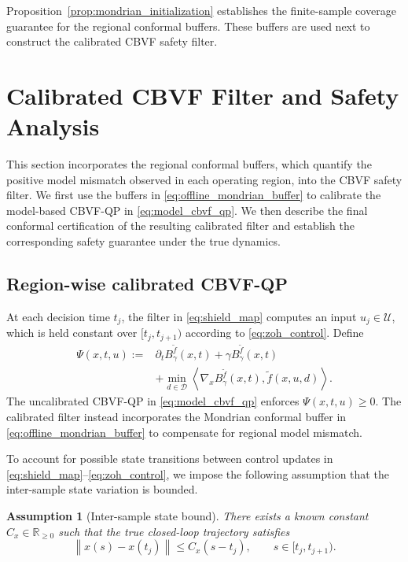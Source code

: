 \documentclass[letterpaper,10pt,conference]{ieeeconf}
\newtheorem{assumption}{Assumption}
\newcommand{\Bm}{B_{\gamma}^{\tilde f}}
\newcommand{\fapp}{\widetilde{f}}
\newcommand{\xv}{x}
\newcommand{\uv}{u}
\newcommand{\dv}{d}
\newcommand{\Uv}{\mathcal{U}}
\newcommand{\Dv}{\mathcal{D}}
\newcommand{\norm}[1]{\left\lVert #1 \right\rVert}
\newcommand{\ip}[2]{\left\langle #1,#2 \right\rangle}
\begin{document}
Proposition~\ref{prop:mondrian_initialization} establishes the finite-sample
coverage guarantee for the regional conformal buffers. These buffers are used
next to construct the calibrated CBVF safety filter.





\section{Calibrated CBVF Filter and Safety Analysis}
\label{sec:calibrated_filter_safety}

This section incorporates the regional conformal buffers, which quantify the
positive model mismatch observed in each operating region, into the CBVF safety
filter. We first use the buffers in \eqref{eq:offline_mondrian_buffer} to
calibrate the model-based CBVF-QP in \eqref{eq:model_cbvf_qp}. We then
describe the final conformal certification of the resulting calibrated filter
and establish the corresponding safety guarantee under the true dynamics.

\subsection{Region-wise calibrated CBVF-QP}

At each decision time $t_j$, the filter in \eqref{eq:shield_map} computes an
input $u_j\in\Uv$, which is held constant over $[t_j,t_{j+1})$ according to
\eqref{eq:zoh_control}. Define
\begin{equation}
\begin{aligned}
\Psi(\xv,t,\uv)
:={}&
\partial_t \Bm(\xv,t)+\gamma\Bm(\xv,t) \\
&+
\min_{\dv\in\Dv}
\ip{\nabla_{\xv}\Bm(\xv,t)}
{\fapp(\xv,\uv,\dv)} .
\end{aligned}
\label{eq:psi_definition}
\end{equation}
The uncalibrated CBVF-QP in \eqref{eq:model_cbvf_qp} enforces
$\Psi(\xv,t,\uv)\geq0$. The calibrated filter instead incorporates the Mondrian conformal buffer in \eqref{eq:offline_mondrian_buffer} to compensate for regional model mismatch.

To account for possible state transitions between control updates in
\eqref{eq:shield_map}--\eqref{eq:zoh_control}, we impose the following
assumption that the inter-sample state variation is bounded.
\begin{assumption}[Inter-sample state bound]
\label{ass:bounded_inter_sample_motion}
There exists a known constant $C_x\in\mathbb R_{\geq0}$ such that the true
closed-loop trajectory satisfies
\begin{equation}
\norm{\xv(s)-\xv(t_j)}
\leq
C_x(s-t_j),
\qquad
s\in[t_j,t_{j+1}).
\label{eq:bounded_inter_sample_motion}
\end{equation}
\end{assumption}
\end{document}
